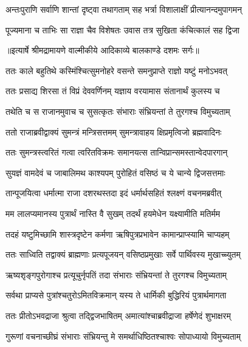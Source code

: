 \twolineshloka
{अन्तःपुराणि सर्वाणि शान्तां दृष्ट्वा तथागताम्}
{सह भर्त्रा विशालाक्षीं प्रीत्यानन्दमुपागमन्} %

\twolineshloka
{पूज्यमाना च ताभिः सा राज्ञा चैव विशेषतः}
{उवास तत्र सुखिता कंचित्कालं सह द्विजा} %


{॥इत्यार्षे श्रीमद्रामायणे वाल्मीकीये आदिकाव्ये बालकाण्डे दशमः सर्गः॥}


\twolineshloka
{ततः काले बहुतिथे कस्मिंश्चित्सुमनोहरे}
{वसन्ते समनुप्राप्ते राज्ञो यष्टुं मनोऽभवत्} %

\twolineshloka
{ततः प्रसाद्य शिरसा तं विप्रं देववर्णिनम्}
{यज्ञाय वरयामास संतानार्थं कुलस्य च} %

\twolineshloka
{तथेति च स राजानमुवाच च सुसत्कृतः}
{संभाराः संभ्रियन्तां ते तुरगश्च विमुच्यताम्} %

\twolineshloka
{ततो राजाब्रवीद्वाक्यं सुमन्त्रं मन्त्रिसत्तमम्}
{सुमन्त्रावाहय क्षिप्रमृत्विजो ब्रह्मवादिनः} %

\twolineshloka
{ततः सुमन्त्रस्त्वरितं गत्वा त्वरितविक्रमः}
{समानयत्स तान्विप्रान्समस्तान्वेदपारगान्} %

\twolineshloka
{सुयज्ञं वामदेवं च जाबालिमथ काश्यपम्}
{पुरोहितं वसिष्ठं च ये चान्ये द्विजसत्तमाः} %

\twolineshloka
{तान्पूजयित्वा धर्मात्मा राजा दशरथस्तदा}
{इदं धर्मार्थसहितं श्लक्ष्णं वचनमब्रवीत्} %

\twolineshloka
{मम लालप्यमानस्य पुत्रार्थं नास्ति वै सुखम्}
{तदर्थं हयमेधेन यक्ष्यामीति मतिर्मम} %

\twolineshloka
{तदहं यष्टुमिच्छामि शास्त्रदृष्टेन कर्मणा}
{ऋषिपुत्रप्रभावेन कामान्प्राप्स्यामि चाप्यहम्} %

\twolineshloka
{ततः साध्विति तद्वाक्यं ब्राह्मणाः प्रत्यपूजयन्}
{वसिष्ठप्रमुखाः सर्वे पार्थिवस्य मुखाच्च्युतम्} %

\twolineshloka
{ऋष्यशृङ्गपुरोगाश्च प्रत्यूचुर्नृपतिं तदा}
{संभाराः संभ्रियन्तां ते तुरगश्च विमुच्यताम्} %

\twolineshloka
{सर्वथा प्राप्यसे पुत्रांश्चतुरोऽमितविक्रमान्}
{यस्य ते धार्मिकी बुद्धिरियं पुत्रार्थमागता} %

\twolineshloka
{ततः प्रीतोऽभवद्राजा श्रुत्वा तद्द्विजभाषितम्}
{अमात्यांश्चाब्रवीद्राजा हर्षेणेदं शुभाक्षरम्} %

\twolineshloka
{गुरूणां वचनाच्छीघ्रं संभाराः संभ्रियन्तु मे}
{समर्थाधिष्ठितश्चाश्वः सोपाध्यायो विमुच्यताम्} %

